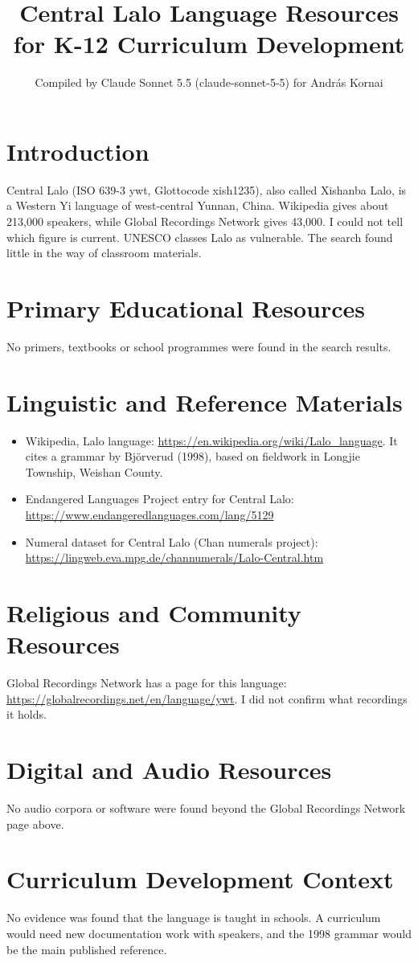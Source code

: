 \documentclass[12pt]{article}
\title{Central Lalo Language Resources for K-12 Curriculum Development}
\author{Compiled by Claude Sonnet 5.5 (claude-sonnet-5-5) for Andr\'as Kornai}
\date{}
\begin{document}
\maketitle

\section{Introduction}
Central Lalo (ISO 639-3 ywt, Glottocode xish1235), also called Xishanba Lalo, is a Western Yi language of west-central Yunnan, China. Wikipedia gives about 213,000 speakers, while Global Recordings Network gives 43,000. I could not tell which figure is current. UNESCO classes Lalo as vulnerable. The search found little in the way of classroom materials.

\section{Primary Educational Resources}
No primers, textbooks or school programmes were found in the search results.

\section{Linguistic and Reference Materials}
\begin{itemize}
\item Wikipedia, Lalo language: \url{https://en.wikipedia.org/wiki/Lalo_language}. It cites a grammar by Bj\"orverud (1998), based on fieldwork in Longjie Township, Weishan County.
\item Endangered Languages Project entry for Central Lalo: \url{https://www.endangeredlanguages.com/lang/5129}
\item Numeral dataset for Central Lalo (Chan numerals project): \url{https://lingweb.eva.mpg.de/channumerals/Lalo-Central.htm}
\end{itemize}

\section{Religious and Community Resources}
Global Recordings Network has a page for this language: \url{https://globalrecordings.net/en/language/ywt}. I did not confirm what recordings it holds.

\section{Digital and Audio Resources}
No audio corpora or software were found beyond the Global Recordings Network page above.

\section{Curriculum Development Context}
No evidence was found that the language is taught in schools. A curriculum would need new documentation work with speakers, and the 1998 grammar would be the main published reference.
\end{document}
